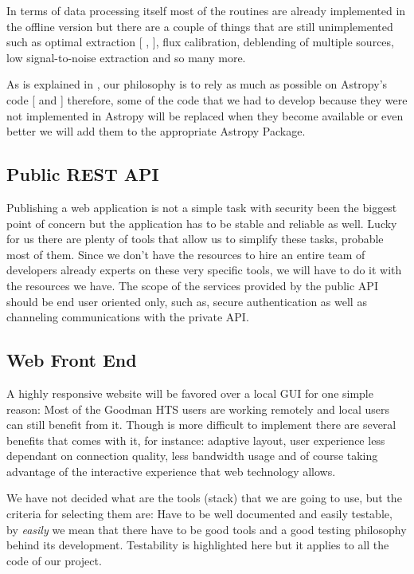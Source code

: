\documentclass[11pt,twoside]{article}
\begin{document}
In terms of data processing itself most of the routines are already implemented in the offline version but there are a couple of things that are still unimplemented such as optimal extraction [ \citet{1989PASP..101.1032M},  \citet{1986PASP...98..609H} ], flux calibration, deblending of multiple sources, low signal-to-noise extraction and so many more.

As is explained in \citet{P9-115_adassxxvii}, our philosophy is to rely as much as possible on Astropy's code   [ \citet{2013A&A...558A..33A} and \citet{2018AJ....156..123A} ] therefore, some of the code that we had to develop because they were not implemented in Astropy will be replaced when they become available or even better we will add them to the appropriate Astropy Package.

\subsection{Public REST API}
Publishing a web application is not a simple task with security been the biggest point of concern but the application has to be stable and reliable as well. Lucky for us there are plenty of tools that allow us to simplify these tasks, probable most of them. Since we don't have the resources to hire an entire team of developers already experts on these very specific tools, we will have to do it with the resources we have. The scope of the services provided by the public API should be end user oriented only, such as, secure authentication as well as channeling communications with the private API.

\subsection{Web Front End}
A highly responsive website will be favored over a local GUI for one simple reason: Most of the Goodman HTS users are working remotely and local users can still benefit from it. Though is more difficult to implement there are several benefits that comes with it, for instance: adaptive layout, user experience less dependant on connection quality, less bandwidth usage and of course taking advantage of the interactive experience that web technology allows.

We have not decided what are the tools (stack) that we are going to use, but the criteria for selecting them are: Have to be well documented and easily testable, by \emph{easily} we mean that there have to be good tools and a good testing philosophy behind its development. Testability is highlighted here but it applies to all the code of our project.
\end{document}
